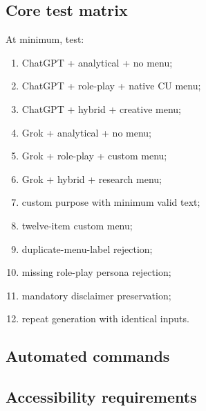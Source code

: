 \documentclass[11pt,letterpaper]{article}
\begin{document}
\subsection{Core test matrix}

At minimum, test:

\begin{enumerate}
    \item ChatGPT + analytical + no menu;
    \item ChatGPT + role-play + native CU menu;
    \item ChatGPT + hybrid + creative menu;
    \item Grok + analytical + no menu;
    \item Grok + role-play + custom menu;
    \item Grok + hybrid + research menu;
    \item custom purpose with minimum valid text;
    \item twelve-item custom menu;
    \item duplicate-menu-label rejection;
    \item missing role-play persona rejection;
    \item mandatory disclaimer preservation;
    \item repeat generation with identical inputs.
\end{enumerate}

\subsection{Automated commands}


\subsection{Accessibility requirements}
\end{document}
